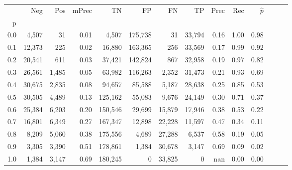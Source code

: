 \begin{tabular}{rrrrrrrrrrrrrr}
\toprule
{} &     Neg &    Pos & mPrec &       TN &       FP &      FN &      TP &  Prec &   Rec & $\hat{p}$ \\
p   &         &        &       &          &          &         &         &       &       &           \\
\midrule
0.0 &   4,507 &     31 &  0.01 &    4,507 &  175,738 &      31 &  33,794 &  0.16 &  1.00 &      0.98 \\
0.1 &  12,373 &    225 &  0.02 &   16,880 &  163,365 &     256 &  33,569 &  0.17 &  0.99 &      0.92 \\
0.2 &  20,541 &    611 &  0.03 &   37,421 &  142,824 &     867 &  32,958 &  0.19 &  0.97 &      0.82 \\
0.3 &  26,561 &  1,485 &  0.05 &   63,982 &  116,263 &   2,352 &  31,473 &  0.21 &  0.93 &      0.69 \\
0.4 &  30,675 &  2,835 &  0.08 &   94,657 &   85,588 &   5,187 &  28,638 &  0.25 &  0.85 &      0.53 \\
0.5 &  30,505 &  4,489 &  0.13 &  125,162 &   55,083 &   9,676 &  24,149 &  0.30 &  0.71 &      0.37 \\
0.6 &  25,384 &  6,203 &  0.20 &  150,546 &   29,699 &  15,879 &  17,946 &  0.38 &  0.53 &      0.22 \\
0.7 &  16,801 &  6,349 &  0.27 &  167,347 &   12,898 &  22,228 &  11,597 &  0.47 &  0.34 &      0.11 \\
0.8 &   8,209 &  5,060 &  0.38 &  175,556 &    4,689 &  27,288 &   6,537 &  0.58 &  0.19 &      0.05 \\
0.9 &   3,305 &  3,390 &  0.51 &  178,861 &    1,384 &  30,678 &   3,147 &  0.69 &  0.09 &      0.02 \\
1.0 &   1,384 &  3,147 &  0.69 &  180,245 &        0 &  33,825 &       0 &   nan &  0.00 &      0.00 \\
\bottomrule
\end{tabular}
